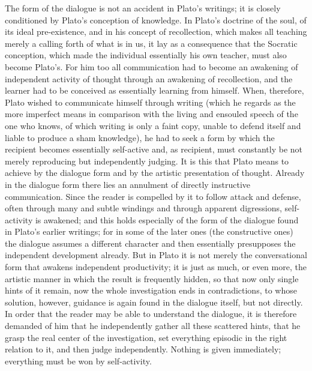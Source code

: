 The form of the dialogue is not an accident in Plato's writings; it is
closely conditioned by Plato's conception of knowledge. In Plato's
doctrine of the soul, of its ideal pre-existence, and in his concept of
recollection, which makes all teaching merely a calling forth of what is in
us, it lay as a consequence that the Socratic conception, which made the
individual essentially his own teacher, must also become Plato's. For him
too all communication had to become an awakening of independent activity of
thought through an awakening of recollection, and the learner had to be
conceived as essentially learning from himself. When, therefore, Plato
wished to communicate himself through writing (which he regards as the more
imperfect means in comparison with the living and ensouled speech of the
one who knows, of which writing is only a faint copy, unable to defend
itself and liable to produce a sham knowledge), he had to seek a
form by which the recipient becomes essentially self-active and, as
recipient, must constantly be not merely reproducing but independently
judging. It is this that Plato means to achieve by the dialogue form and by
the artistic presentation of thought. Already in the dialogue form there
lies an annulment of directly instructive communication. Since the reader is
compelled by it to follow attack and defense, often through many and subtle
windings and through apparent digressions, self-activity is awakened; and
this holds especially of the form of the dialogue found in Plato's earlier
writings; for in some of the later ones (the constructive ones) the dialogue
assumes a different character and then essentially presupposes the
independent development already. But in Plato it is not merely the
conversational form that awakens independent productivity; it is just as
much, or even more, the artistic manner in which the result is frequently
hidden, so that now only single hints of it remain, now the whole
investigation ends in contradictions, to whose solution, however, guidance
is again found in the dialogue itself, but not directly. In order that the
reader may be able to understand the dialogue, it is therefore demanded of
him that he independently gather all these scattered hints, that he grasp
the real center of the investigation, set everything episodic in the right
relation to it, and then judge independently. Nothing is given immediately;
everything must be won by self-activity.

\divrule

